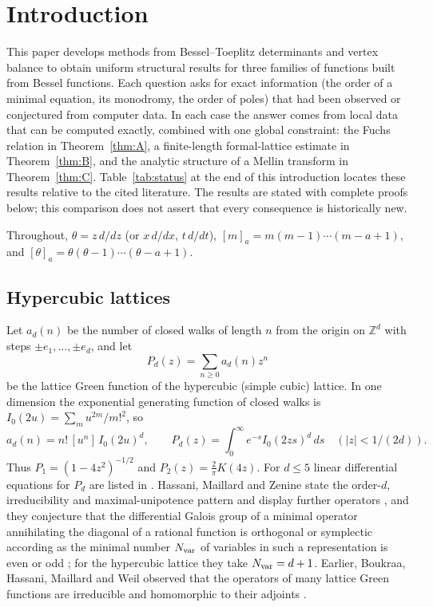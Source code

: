 \documentclass[11pt]{amsart}
\theoremstyle{definition}
\newcommand{\Z}{\mathbb Z}
\newcommand{\ff}[2]{[#1]_{#2}}
\begin{document}
\maketitle
\tableofcontents

\section{Introduction}\label{sec:intro}

This paper develops methods from Bessel--Toeplitz determinants \cite{KBT} and vertex balance \cite{KVB} to obtain uniform structural results for three families of functions built from Bessel functions. Each question asks for exact information (the order of a minimal equation, its monodromy, the order of poles) that had been observed or conjectured from computer data. In each case the answer comes from local data that can be computed exactly, combined with one global constraint: the Fuchs relation in Theorem~\ref{thm:A}, a finite-length formal-lattice estimate in Theorem~\ref{thm:B}, and the analytic structure of a Mellin transform in Theorem~\ref{thm:C}. Table~\ref{tab:status} at the end of this introduction locates these results relative to the cited literature. The results are stated with complete proofs below; this comparison does not assert that every consequence is historically new.

Throughout, $\theta=z\,d/dz$ (or $x\,d/dx$, $t\,d/dt$), $\ff ma=m(m-1)\cdots(m-a+1)$, and $\ff\theta a=\theta(\theta-1)\cdots(\theta-a+1)$.

\subsection{Hypercubic lattices}
Let $a_d(n)$ be the number of closed walks of length $n$ from the origin on $\Z^d$ with steps $\pm e_1,\dots,\pm e_d$, and let
\[
P_d(z)=\sum_{n\ge0}a_d(n)z^n
\]
be the lattice Green function of the hypercubic (simple cubic) lattice. In one dimension the exponential generating function of closed walks is $I_0(2u)=\sum_mu^{2m}/m!^2$, so
\begin{equation}\label{eq:ad}
a_d(n)=n!\,[u^n]\,I_0(2u)^d,\qquad P_d(z)=\int_0^\infty e^{-s}I_0(2zs)^d\,ds\quad(|z|<1/(2d)).
\end{equation}
Thus $P_1=(1-4z^2)^{-1/2}$ and $P_2(z)=\frac2\pi K(4z)$. For $d\le5$ linear differential equations for $P_d$ are listed in \cite{Gut10}. Hassani, Maillard and Zenine state the order-$d$, irreducibility and maximal-unipotence pattern and display further operators \cite[Appendix~A.1.1]{HMZ25}, and they conjecture that the differential Galois group of a minimal operator annihilating the diagonal of a rational function is orthogonal or symplectic according as the minimal number $N_{\rm var}$ of variables in such a representation is even or odd \cite[\S1.5]{HMZ25}; for the hypercubic lattice they take $N_{\rm var}=d+1$. Earlier, Boukraa, Hassani, Maillard and Weil observed that the operators of many lattice Green functions are irreducible and homomorphic to their adjoints \cite{BHMW14}.
\end{document}
